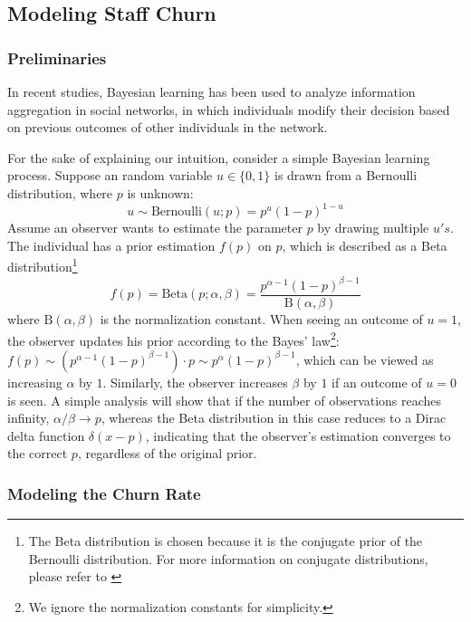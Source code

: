 \documentclass[tcn = 37075, sheet = false, abstract = false]{mcmthesis}
\begin{document}
	\subsection{Modeling Staff Churn}
	
	\subsubsection{Preliminaries}
	
	In recent studies, Bayesian learning has been used to analyze information aggregation in social networks\cite{acemoglu2011bayesian}, in which individuals modify their decision based on previous outcomes of other individuals in the network. 
	
	For the sake of explaining our intuition, consider a simple Bayesian learning process. Suppose an random variable $u \in \{0, 1\}$ is drawn from a Bernoulli distribution, where $p$ is unknown:
	\begin{equation}
	u \sim \mathrm{Bernoulli}(u; p) = p^u(1-p)^{1-u}
	\end{equation}
	Assume an observer wants to estimate the parameter $p$ by drawing multiple $u's$. The individual has a prior estimation $f(p)$ on $p$, which is described as a Beta distribution\footnote{The Beta distribution is chosen because it is the conjugate prior of the Bernoulli distribution. For more information on conjugate distributions, please refer to  \cite{bishop2006pattern}}
	\begin{equation}
	f(p) = \mathrm{Beta}(p; \alpha, \beta) = \frac{p^{\alpha - 1}(1-p)^{\beta - 1}}{\mathrm{B}(\alpha, \beta)}
	\end{equation}
	where $\mathrm{B}(\alpha, \beta)$ is the normalization constant.
	When seeing an outcome of $u = 1$, the observer updates his prior according to the Bayes' law\footnote{We ignore the normalization constants for simplicity.}: $f(p) \sim (p^{\alpha-1}(1-p)^{\beta-1}) \cdot p \sim p^{\alpha}(1-p)^{\beta-1}$, which can be viewed as increasing $\alpha$ by $1$. Similarly, the observer increases $\beta$ by $1$ if an outcome of $u = 0$ is seen. A simple analysis will show that if the number of observations reaches infinity, $\alpha / \beta \rightarrow p$, whereas the Beta distribution in this case reduces to a Dirac delta function $\delta(x - p)$, indicating that the observer's estimation converges to the correct $p$, regardless of the original prior.
	
	\subsubsection{Modeling the Churn Rate}
	
\end{document}
